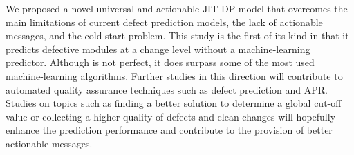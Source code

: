 We proposed a novel universal and actionable JIT-DP model that overcomes the main limitations of current defect prediction models, the lack of actionable messages, and the cold-start problem.
This study is the first of its kind in that it predicts defective modules at a change level without a machine-learning predictor. 
Although {\simfinmo} is not perfect, it does surpass some of the most used machine-learning algorithms.
Further studies in this direction will contribute to automated quality assurance techniques such as defect prediction and APR.
Studies on topics such as finding a better solution to determine a global cut-off value or collecting a higher quality of defects and clean changes will hopefully enhance the prediction performance and contribute to the provision of better actionable messages.